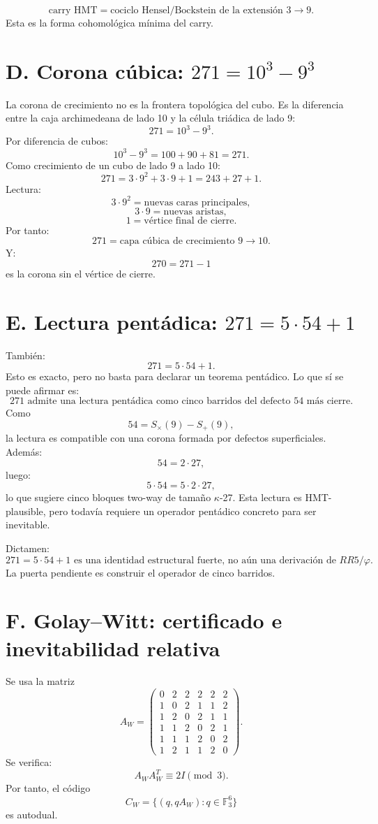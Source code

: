 \documentclass[11pt,a4paper]{article}
\theoremstyle{definition}\newtheorem{definicion}[teorema]{Definici\'on}
\theoremstyle{remark}\newtheorem{observacion}[teorema]{Observaci\'on}
\newcommand{\F}{\mathbb F}
\begin{document}
\[
\boxed{\text{carry HMT}=\text{cociclo Hensel/Bockstein de la extensi\'on }3\to9.}
\]
Esta es la forma cohomol\'ogica m\'inima del carry.

\section{D. Corona c\'ubica: \(271=10^3-9^3\)}

La corona de crecimiento no es la frontera topol\'ogica del cubo. Es la diferencia entre la caja archimedeana de lado 10 y la c\'elula tri\'adica de lado 9:
\[
271=10^3-9^3.
\]
Por diferencia de cubos:
\[
10^3-9^3=100+90+81=271.
\]
Como crecimiento de un cubo de lado 9 a lado 10:
\[
271=3\cdot9^2+3\cdot9+1=243+27+1.
\]
Lectura:
\[
3\cdot9^2=\text{nuevas caras principales},
\]
\[
3\cdot9=\text{nuevas aristas},
\]
\[
1=\text{v\'ertice final de cierre}.
\]
Por tanto:
\[
\boxed{271=\text{capa c\'ubica de crecimiento }9\to10.}
\]
Y:
\[
270=271-1
\]
es la corona sin el v\'ertice de cierre.

\section{E. Lectura pent\'adica: \(271=5\cdot54+1\)}

Tambi\'en:
\[
271=5\cdot54+1.
\]
Esto es exacto, pero no basta para declarar un teorema pent\'adico. Lo que s\'i se puede afirmar es:
\[
\boxed{271\text{ admite una lectura pent\'adica como cinco barridos del defecto }54\text{ m\'as cierre}.}
\]
Como
\[
54=S_\times(9)-S_+(9),
\]
la lectura es compatible con una corona formada por defectos superficiales. Adem\'as:
\[
54=2\cdot27,
\]
luego:
\[
5\cdot54=5\cdot2\cdot27,
\]
lo que sugiere cinco bloques two-way de tama\~no \(\kappa\)-27. Esta lectura es HMT-plausible, pero todav\'ia requiere un operador pent\'adico concreto para ser inevitable.

Dictamen:
\[
\boxed{271=5\cdot54+1\text{ es una identidad estructural fuerte, no a\'un una derivaci\'on de }RR5/\varphi.}
\]
La puerta pendiente es construir el operador de cinco barridos.

\section{F. Golay--Witt: certificado e inevitabilidad relativa}

Se usa la matriz
\[
A_W=
\begin{pmatrix}
0&2&2&2&2&2\\
1&0&2&1&1&2\\
1&2&0&2&1&1\\
1&1&2&0&2&1\\
1&1&1&2&0&2\\
1&2&1&1&2&0
\end{pmatrix}.
\]
Se verifica:
\[
A_WA_W^T\equiv2I\pmod3.
\]
Por tanto, el c\'odigo
\[
C_W=\{(q,qA_W):q\in\F_3^6\}
\]
es autodual.
\end{document}

